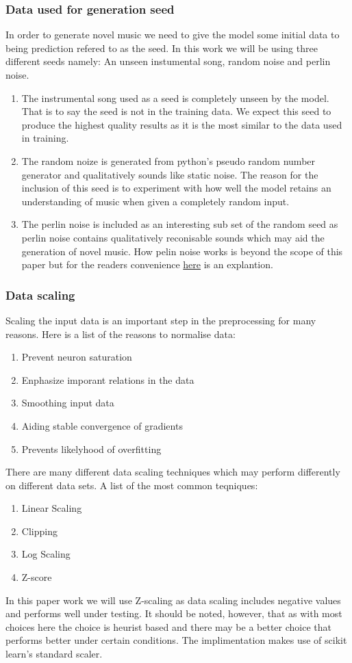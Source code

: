 \documentclass{article}
\begin{document}
\subsubsection{Data used for generation seed}
In order to generate novel music we need to give the model some initial data to being prediction refered to as the seed. In this work we will be using three different seeds namely: An unseen instumental song, random noise and perlin noise.
\begin{enumerate}
\item The instrumental song used as a seed is completely unseen by the model. That is to say the seed is not in the training data. We expect this seed to produce the highest quality results as it is the most similar to the data used in training.
\item The random noize is generated from python's pseudo random number generator and qualitatively sounds like static noise. The reason for the inclusion of this seed is to experiment with how well the model retains an understanding of music when given a completely random input.
\item The perlin noise is included as an interesting sub set of the random seed as perlin noise contains qualitatively reconisable sounds which may aid the generation of novel music. How pelin noise works is beyond the scope of this paper but for the readers convenience \href{https://adrianb.io/2014/08/09/perlinnoise.html}{here} is an explantion.
\end{enumerate}

\subsubsection{Data scaling}
Scaling the input data is an important step in the preprocessing for many reasons. Here is a list of the reasons to normalise data:
\begin{enumerate}
\item Prevent neuron saturation
\item Enphasize imporant relations in the data
\item Smoothing input data 
\item Aiding stable convergence of gradients
\item Prevents likelyhood of overfitting
\end{enumerate}
There are many different data scaling techniques which may perform differently on different data sets. A list of the most common teqniques:
\begin{enumerate}
\item Linear Scaling
\item Clipping 
\item Log Scaling
\item Z-score
\end{enumerate}
In this paper work we will use Z-scaling as data scaling includes negative values and performs well under testing. It should be noted, however, that as with most choices here the choice is heurist based and there may be a better choice that performs better under certain conditions. The implimentation makes use of scikit learn's standard scaler\cite{scikit-learn}.
\end{document}
